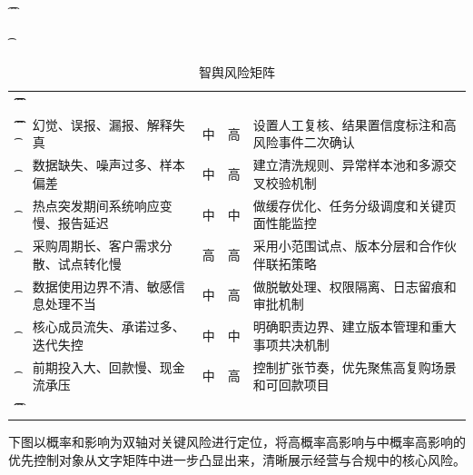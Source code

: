 \begin{table}[htbp]
	\t\centering
	\t\caption{智舆风险矩阵}
	\t\begin{tabularx}{\textwidth}{|L{2.2cm}L{3.1cm}C{1.4cm}C{1.4cm}Y|}
		\t\t\toprule
		\t\t{} &      &  &  &            \\
		\t\t\midrule
		\t\t{}
		\t{}           & 幻觉、误报、漏报、解释失真      & 中            & 高            & 设置人工复核、结果置信度标注和高风险事件二次确认 \\
		\t{}           & 数据缺失、噪声过多、样本偏差     & 中            & 高            & 建立清洗规则、异常样本池和多源交叉校验机制    \\
		\t{}           & 热点突发期间系统响应变慢、报告延迟  & 中            & 中            & 做缓存优化、任务分级调度和关键页面性能监控    \\
		\t{}           & 采购周期长、客户需求分散、试点转化慢 & 高            & 高            & 采用小范围试点、版本分层和合作伙伴联拓策略    \\
		\t{}           & 数据使用边界不清、敏感信息处理不当  & 中            & 高            & 做脱敏处理、权限隔离、日志留痕和审批机制     \\
		\t{}           & 核心成员流失、承诺过多、迭代失控   & 中            & 中            & 明确职责边界、建立版本管理和重大事项共决机制   \\
		\t{}           & 前期投入大、回款慢、现金流承压    & 中            & 高            & 控制扩张节奏，优先聚焦高复购场景和可回款项目   \\
		\t\t\bottomrule
		\t\end{tabularx}
\end{table}

下图以概率和影响为双轴对关键风险进行定位，将高概率高影响与中概率高影响的优先控制对象从文字矩阵中进一步凸显出来，清晰展示经营与合规中的核心风险。

